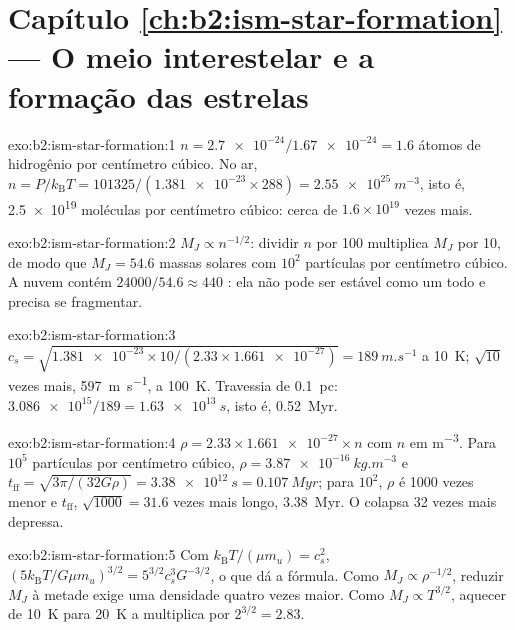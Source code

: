 \section*{Capítulo \ref{ch:b2:ism-star-formation} --- O meio interestelar e a formação das estrelas}

\begin{solution}{exo:b2:ism-star-formation:1}
$n = \num{2.7e-24}/\num{1.67e-24} = 1.6$ átomos de hidrogênio por centímetro cúbico. No ar,
$n = P/k_{\mathrm B}T = 101325/(\num{1.381e-23}\times288) = \qty{2.55e25}{m^{-3}}$,
isto é, \num{2.5e19} moléculas por centímetro cúbico: cerca de $1.6\times10^{19}$ vezes
mais.
\end{solution}

\begin{solution}{exo:b2:ism-star-formation:2}
$M_J \propto n^{-1/2}$: dividir $n$ por 100 multiplica $M_J$ por 10, de modo que
$M_J = 54.6$ massas solares com $10^2$ partículas por centímetro cúbico. A nuvem contém
$\num{24000}/54.6 \approx 440$ : ela não pode ser estável como um todo e precisa
se fragmentar.
\end{solution}

\begin{solution}{exo:b2:ism-star-formation:3}
$c_s = \sqrt{\num{1.381e-23}\times10/(2.33\times\num{1.661e-27})} =
\qty{189}{m.s^{-1}}$ a \qty{10}{K}; $\sqrt{10}$ vezes mais, \qty{597}{m.s^{-1}},
a \qty{100}{K}. Travessia de \qty{0.1}{pc}: $\num{3.086e15}/189 = \qty{1.63e13}{s}$,
isto é, \qty{0.52}{Myr}.
\end{solution}

\begin{solution}{exo:b2:ism-star-formation:4}
$\rho = 2.33\times\num{1.661e-27}\times n$ com $n$ em \unit{m^{-3}}. Para $10^5$
partículas por centímetro cúbico, $\rho = \qty{3.87e-16}{kg.m^{-3}}$ e
$t_{\mathrm{ff}} = \sqrt{3\pi/(32G\rho)} = \qty{3.38e12}{s} = \qty{0.107}{Myr}$; para
$10^2$, $\rho$ é \num{1000} vezes menor e $t_{\mathrm{ff}}$, $\sqrt{1000} = 31.6$
vezes mais longo, \qty{3.38}{Myr}. O  colapsa 32 vezes mais depressa.
\end{solution}

\begin{solution}{exo:b2:ism-star-formation:5}
Com $k_{\mathrm B}T/(\mu m_u) = c_s^2$, $(5k_{\mathrm B}T/G\mu m_u)^{3/2} =
5^{3/2}c_s^3G^{-3/2}$, o que dá a fórmula. Como $M_J \propto \rho^{-1/2}$,
reduzir $M_J$ à metade exige uma densidade quatro vezes maior. Como $M_J \propto T^{3/2}$,
aquecer de \qty{10}{K} para \qty{20}{K} a multiplica por $2^{3/2} = 2.83$.
\end{solution}

